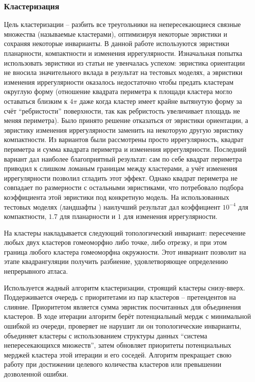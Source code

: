 \documentclass[12pt]{extarticle}
\begin{document}
\subsubsection{Кластеризация}
Цель кластеризации -- разбить все треугольники на непересекающиеся связные множества (называемые кластерами), оптимизируя некоторые эвристики и сохраняя некоторые инварианты. В данной работе используются эвристики планарности, компактности и изменения иррегулярности. Изначальная попытка использовать эвристики из статьи \cite{garland2001} не увенчалась успехом: эвристика ориентации не вносила значительного вклада в результат на тестовых моделях, а эвристики изменения иррегулярности оказалось недостаточно чтобы предать кластерам округлую форму (отношение квадрата периметра к площади кластера могло оставаться близким к $4\pi$ даже когда кластер имеет крайне вытянутую форму за счёт ``ребристости'' поверхности, так как ребристость увеличивает площадь не меняя периметра). Было принято решение отказаться от эвристики ориентации, а эвристику изменения иррегулярности заменить на некоторую другую эвристику компактности. Из вариантов были рассмотрены просто иррегулярность, квадрат периметра и сумма квадрата периметра и изменения иррегулярности. Последний вариант дал наиболее благоприятный результат: сам по себе квадрат периметра приводил к слишком ломаным границам между кластерами, а учёт изменения иррегулярности позволил сгладить этот эффект. Однако квадрат периметра не совпадает по размерности с остальными эвристиками, что потребовало подбора коэффициента этой эвристики под конкретную модель. На использованных тестовых моделях (ландшафты \cite{quixel_megascans}) наилучший результат дал коэффициент $10^{-4}$ для компактности, $1.7$ для планарности и $1$ для изменения иррегулярности.

На кластеры накладывается следующий топологический инвариант: пересечение любых двух кластеров гомеоморфно либо точке, либо отрезку, и при этом граница любого кластера гомеоморфна окружности. Этот инвариант позволит на этапе квадрангуляции получить разбиение, удовлетворяющее определению непрерывного атласа.

Используется жадный алгоритм кластеризации, строящий кластеры снизу-вверх. Поддерживается очередь с приоритетами из пар кластеров -- претендентов на слияние. Приоритетом является сумма эвристик посчитанных для объединения кластеров. В ходе итерации алгоритм берёт потенциальный мердж с минимальной ошибкой из очереди, проверяет не нарушит ли он топологические инварианты, объединяет кластеры с использованием структуры данных ``система непересекающихся множеств'', затем обновляет приоритеты потенциальных мерджей кластера этой итерации и его соседей. Алгоритм прекращает свою работу при достижении целевого количества кластеров или превышении дозволенной ошибки.
\end{document}
